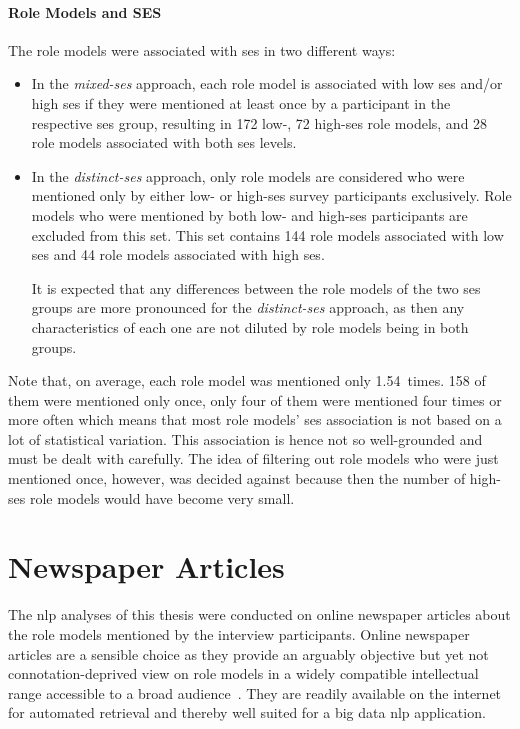 \paragraph{Role Models and SES}
The role models were associated with \gls{ses} in two different ways:
\begin{itemize}
    \item In the \textit{mixed-\gls{ses}} approach, each role model is associated with low \gls{ses} and/or high \gls{ses} if they were mentioned at least once by a participant in the respective \gls{ses} group, resulting in \SI{172}{} low-, \SI{72}{} high-\gls{ses} role models, and \SI{28}{} role models associated with both \gls{ses} levels.

    \item In the \textit{distinct-\gls{ses}} approach, only role models are considered who were mentioned only by either low- or high-\gls{ses} survey participants exclusively. Role models who were mentioned by both low- and high-\gls{ses} participants are excluded from this set. This set contains \SI{144}{} role models associated with low \gls{ses} and \SI{44}{} role models associated with high \gls{ses}.
    
    It is expected that any differences between the role models of the two \gls{ses} groups are more pronounced for the \textit{distinct-\gls{ses}} approach, as then any characteristics of each one are not diluted by role models being in both groups.
\end{itemize}

Note that, on average, each role model was mentioned only \SI{1.54}{times}. \SI{158}{} of them were mentioned only once, only four of them were mentioned four times or more often which means that most role models' \gls{ses} association is not based on a lot of statistical variation. This association is hence not so well-grounded and must be dealt with carefully. The idea of filtering out role models who were just mentioned once, however, was decided against because then the number of high-\gls{ses} role models would have become very small.


\section{Newspaper Articles}
The \gls{nlp} analyses of this thesis were conducted on online newspaper articles about the role models mentioned by the interview participants. Online newspaper articles are a sensible choice as they provide an arguably objective but yet not connotation-deprived view on role models in a  widely compatible intellectual range accessible to a broad audience~\autocite{dubied_studying_2014}. They are readily available on the internet for automated retrieval and thereby well suited for a big data \gls{nlp} application.

